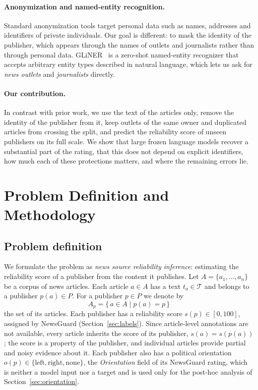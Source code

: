 \documentclass[11pt,a4paper]{article}
\begin{document}
\paragraph{Anonymization and named-entity recognition.}
Standard anonymization tools target personal data such as names, addresses and identifiers of private individuals.
Our goal is different: to mask the identity of the publisher, which appears through the names of outlets and
journalists rather than through personal data. GLiNER~\cite{zaratiana2024gliner} is a zero-shot named-entity
recognizer that accepts arbitrary entity types described in natural language, which lets us ask for \emph{news
outlets} and \emph{journalists} directly.

\paragraph{Our contribution.}
In contrast with prior work, we use the text of the articles only, remove the identity of the publisher from it, keep
outlets of the same owner and duplicated articles from crossing the split, and predict the reliability score of unseen
publishers on its full scale. We show that large frozen language models recover a substantial part of the rating,
that this does not depend on explicit identifiers, how much each of these protections matters, and where the remaining
errors lie.

\section{Problem Definition and Methodology}\label{sec:problem}

\subsection{Problem definition}\label{sec:definition}
We formulate the problem as \emph{news source reliability inference}: estimating the reliability score of a publisher
from the content it publishes. Let $A = \{a_1, \ldots, a_n\}$ be a corpus of news articles. Each article $a \in A$
has a text $t_a \in \mathcal{T}$ and belongs to a publisher $p(a) \in P$. For a publisher $p \in P$ we denote by
\[
A_p = \{\, a \in A \mid p(a) = p \,\}
\]
the set of its articles. Each publisher has a reliability score $s(p) \in [0, 100]$, assigned by NewsGuard
(Section~\ref{sec:labels}). Since article-level annotations are not available, every article inherits the score of
its publisher, $s(a) = s(p(a))$; the score is a property of the publisher, and individual articles provide partial
and noisy evidence about it. Each publisher also has a political orientation $o(p) \in \{\text{left}, \text{right},
\text{none}\}$, the \emph{Orientation} field of its NewsGuard rating, which is neither a model input nor a target and is
used only for the post-hoc analysis of Section~\ref{sec:orientation}.
\end{document}
